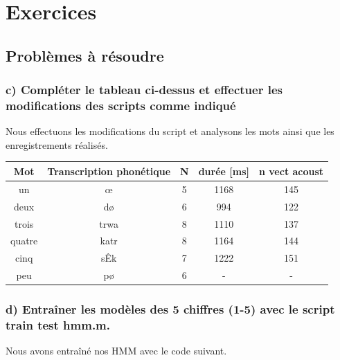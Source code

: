 
\chapter{Exercices} %

\label{Chapitre 2} %


\section{Problèmes à résoudre}

\subsection{c) Compléter le tableau ci-dessus et effectuer les modifications des scripts comme indiqué}

Nous effectuons les modifications du script et analysons les mots ainsi que les enregistrements réalisés.

\begin{tabular}{|c|c|c|c|c|}
\hline 
Mot & Transcription phonétique & N & durée [ms] & n vect acoust \\ 
\hline 
un & œ & 5 & 1168 & 145 \\ 
\hline 
deux & dø & 6 & 994 & 122 \\ 
\hline 
trois & trwa & 8 & 1110 & 137 \\ 
\hline 
quatre & katr & 8 & 1164 & 144 \\ 
\hline 
cinq & sÊk & 7 & 1222 & 151 \\ 
\hline 
peu & pø & 6 & - & - \\ 
\hline 
\end{tabular}

\subsection{d) Entraîner les modèles des 5 chiffres (1-5) avec le script train test hmm.m.}

Nous avons entraîné nos HMM avec le code suivant.

